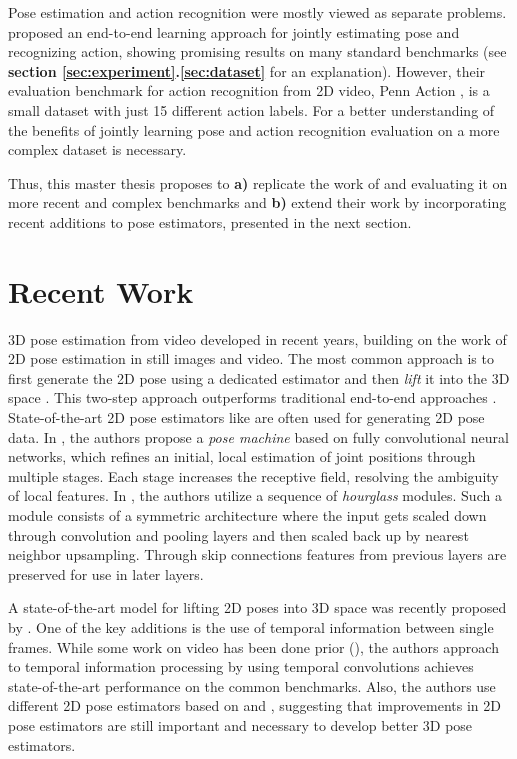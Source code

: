 \documentclass[twoside]{article}
\begin{document}
\begin{multicols}{2}
Pose estimation and action recognition were mostly viewed as separate problems.
\cite{luvizon_2d/3d_2018} proposed an end-to-end learning approach for jointly estimating pose and recognizing action, showing promising results on many standard benchmarks (see \textbf{section \ref{sec:experiment}.\ref{sec:dataset}} for an explanation).
However, their evaluation benchmark for action recognition from 2D video, Penn Action \cite{zhang_actemes_2013}, is a small dataset with just 15 different action labels.
For a better understanding of the benefits of jointly learning pose and action recognition evaluation on a more complex dataset is necessary.

Thus, this master thesis proposes to \textbf{a)} replicate the work of \cite{luvizon_2d/3d_2018} and evaluating it on more recent and complex benchmarks and \textbf{b)} extend their work by incorporating recent additions to pose estimators, presented in the next section.

\section{Recent Work}
\label{sec:recent}
3D pose estimation from video developed in recent years, building on the work of 2D pose estimation in still images and video.
The most common approach is to first generate the 2D pose using a dedicated estimator and then \textit{lift} it into the 3D space \cite{pavllo_3d_2019}\cite{martinez_simple_2017}.
This two-step approach outperforms traditional end-to-end approaches \cite{pavllo_3d_2019}.
State-of-the-art 2D pose estimators like \cite{newell_stacked_2016}\cite{wei_convolutional_2016} are often used for generating 2D pose data.
In \cite{wei_convolutional_2016}, the authors propose a \textit{pose machine} based on fully convolutional neural networks, which refines an initial, local estimation of joint positions through multiple stages.
Each stage increases the receptive field, resolving the ambiguity of local features.
In \cite{newell_stacked_2016}, the authors utilize a sequence of \textit{hourglass} modules.
Such a module consists of a symmetric architecture where the input gets scaled down through convolution and pooling layers and then scaled back up by nearest neighbor upsampling.
Through skip connections features from previous layers are preserved for use in later layers.

A state-of-the-art model for lifting 2D poses into 3D space was recently proposed by \cite{pavllo_3d_2019}.
One of the key additions is the use of temporal information between single frames.
While some work on video has been done prior (\cite{lin_recurrent_2017}\cite{hossain_exploiting_2018}), the authors approach to temporal information processing by using temporal convolutions achieves state-of-the-art performance on the common benchmarks.
Also, the authors use different 2D pose estimators based on \cite{he_mask_2017} and \cite{chen_cascaded_2018}, suggesting that improvements in 2D pose estimators are still important and necessary to develop better 3D pose estimators.


\end{multicols}
\end{document}
